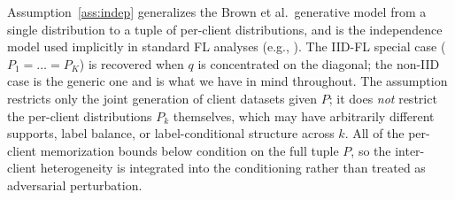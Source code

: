 Assumption~\ref{ass:indep} generalizes the Brown et al.\ generative model from a single distribution to a tuple of per-client distributions, and is the independence model used implicitly in standard FL analyses (e.g., \citealt{Bornstein2022SWIFT}). The IID-FL special case (\(P_1=\dots=P_K\)) is recovered when \(q\) is concentrated on the diagonal; the non-IID case is the generic one and is what we have in mind throughout. The assumption restricts only the joint generation of client datasets given \(P\); it does \emph{not} restrict the per-client distributions \(P_k\) themselves, which may have arbitrarily different supports, label balance, or label-conditional structure across \(k\). All of the per-client memorization bounds below condition on the full tuple \(P\), so the inter-client heterogeneity is integrated into the conditioning rather than treated as adversarial perturbation.
